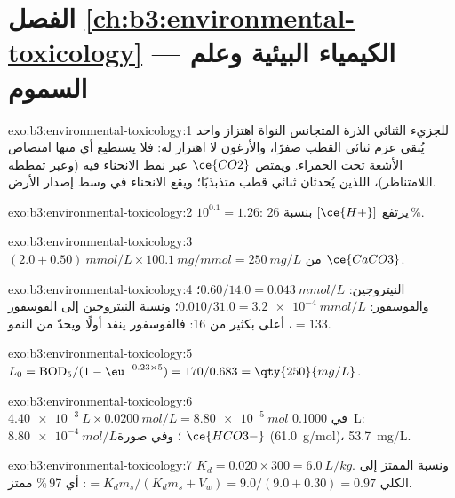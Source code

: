 \section*{الفصل \ref{ch:b3:environmental-toxicology} --- الكيمياء البيئية وعلم السموم}

\begin{solution}{exo:b3:environmental-toxicology:1}
للجزيء الثنائي الذرة المتجانس النواة اهتزاز واحد يُبقي عزم ثنائي القطب صفرًا،
والأرغون لا اهتزاز له: فلا يستطيع أي منها امتصاص الأشعة تحت الحمراء. ويمتص $\ce{CO2}$ عبر
نمط الانحناء فيه (وعبر تمططه اللامتناظر)، اللذين يُحدثان ثنائي قطب
متذبذبًا؛ ويقع الانحناء في وسط إصدار الأرض.
\end{solution}

\begin{solution}{exo:b3:environmental-toxicology:2}
$10^{0.1} = 1.26$: يرتفع $[\ce{H+}]$ بنسبة 26\,\%.
\end{solution}

\begin{solution}{exo:b3:environmental-toxicology:3}
$(2.0 + 0.50)\ \unit{mmol/L} \times \qty{100.1}{mg/mmol} = \qty{250}{mg/L}$ من $\ce{CaCO3}$.
\end{solution}

\begin{solution}{exo:b3:environmental-toxicology:4}
النيتروجين: $0.60/14.0 = \qty{0.043}{mmol/L}$؛ والفوسفور: $0.010/31.0 = \qty{3.2e-4}{mmol/L}$؛ ونسبة النيتروجين إلى الفوسفور $= 133$، أعلى بكثير من 16: فالفوسفور ينفد
أولًا ويحدّ من النمو.
\end{solution}

\begin{solution}{exo:b3:environmental-toxicology:5}
$L_0 = \mathrm{BOD_5}/(1 - \eu^{-0.23 \times 5}) = 170/0.683 = \qty{250}{mg/L}$.
\end{solution}

\begin{solution}{exo:b3:environmental-toxicology:6}
$\qty{4.40e-3}{L} \times \qty{0.0200}{mol/L} = \qty{8.80e-5}{mol}$ في \qty{0.1000}{L}:  $\qty{8.80e-4}{mol/L}$؛ وفي صورة $\ce{HCO3-}$ (\qty{61.0}{g/mol})،
\qty{53.7}{mg/L}.
\end{solution}

\begin{solution}{exo:b3:environmental-toxicology:7}
$K_d = 0.020 \times 300 = \qty{6.0}{L/kg}$. ونسبة الممتز إلى الكلي $= K_dm_s/(K_dm_s + V_w) = 9.0/(9.0 + 0.30) = 0.97$: أي 97\,\% ممتز.
\end{solution}

